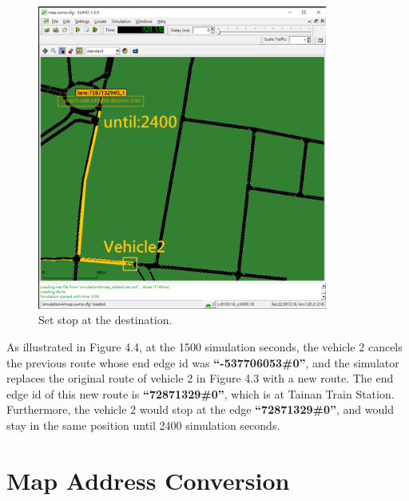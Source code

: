 \documentclass[12pt]{ksthesis}
\begin{document}
\begin{thesis}
{\begin{figure}[H]
\centering
\includegraphics[width=0.85\textwidth]{./Thesis_figures/F4-4_setStop.PNG}
\caption{\large Set stop at the destination.}
\vspace{0.5cm}
\label{Fig:Set_stop}
\end{figure}


As illustrated in Figure 4.4, at the 1500 simulation seconds, the vehicle 2 cancels the previous route whose end edge id was \textbf{“-537706053\#0”}, and the simulator replaces the original route of vehicle 2 in Figure 4.3 with a new route. The end edge id of this new route is \textbf{“72871329\#0”}, which is at Tainan Train Station. Furthermore, the vehicle 2 would stop at the edge \textbf{“72871329\#0”}, and would stay in the same position until 2400 simulation seconds.



\section{Map Address Conversion}

}
\end{thesis}
\end{document}
